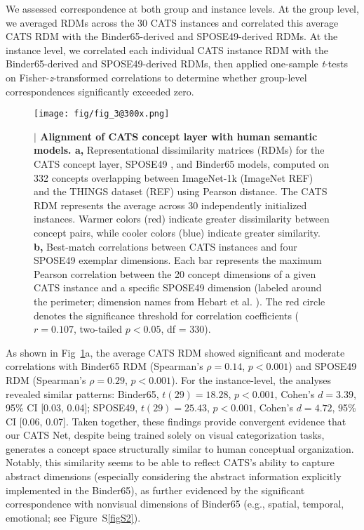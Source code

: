 \documentclass[pdflatex,sn-mathphys-num,lineno]{sn-jnl}%
\begin{document}
\begin{CJK}{UTF8}{gbsn}
We assessed correspondence at both group and instance levels. At the group level, we averaged RDMs across the 30 CATS instances and correlated this average CATS RDM with the Binder65-derived and SPOSE49-derived RDMs. At the instance level, we correlated each individual CATS instance RDM with the Binder65-derived and SPOSE49-derived RDMs, then applied one-sample \textit{t}-tests on Fisher-\textit{z}-transformed correlations to determine whether group-level correspondences significantly exceeded zero.

\begin{figure}[htbp]
\centering
\texttt{[image: fig/fig\_3@300x.png]}
\caption{\textbf{$\vert$ Alignment of CATS concept layer with human semantic models. a,} Representational dissimilarity matrices (RDMs) for the CATS concept layer, SPOSE49 \cite{hebart_revealing_2020}, and Binder65 \cite{binder_toward_2016} models, computed on 332 concepts overlapping between ImageNet-1k (ImageNet REF) and the THINGS dataset (REF) using Pearson distance. The CATS RDM represents the average across 30 independently initialized instances. Warmer colors (red) indicate greater dissimilarity between concept pairs, while cooler colors (blue) indicate greater similarity. \textbf{b,} Best-match correlations between CATS instances and four SPOSE49 exemplar dimensions. Each bar represents the maximum Pearson correlation between the 20 concept dimensions of a given CATS instance and a specific SPOSE49 dimension (labeled around the perimeter; dimension names from Hebart et al. \cite{hebart_revealing_2020}). The red circle denotes the significance threshold for correlation coefficients ($r = 0.107$, two-tailed $p < 0.05$, df = 330).}
\label{fig3}
\end{figure}

As shown in Fig~\ref{fig3}a, the average CATS RDM showed significant and moderate correlations with Binder65 RDM (Spearman’s $\rho = 0.14$, $p < 0.001$) and SPOSE49 RDM (Spearman’s $\rho = 0.29$, $p < 0.001$). For the instance-level, the analyses revealed similar patterns: Binder65, $t(29) = 18.28$, $p < 0.001$, Cohen’s $d = 3.39$, 95\% CI [0.03, 0.04]; SPOSE49, $t(29) = 25.43$, $p < 0.001$, Cohen’s $d = 4.72$, 95\% CI [0.06, 0.07]. Taken together, these findings provide convergent evidence that our CATS Net, despite being trained solely on visual categorization tasks, generates a concept space structurally similar to human conceptual organization. Notably, this similarity seems to be able to reflect CATS’s ability to capture abstract dimensions (especially considering the abstract information explicitly implemented in the Binder65), as further evidenced by the significant correspondence with nonvisual dimensions of Binder65 (e.g., spatial, temporal, emotional; see Figure~S\ref{figS2}). 


\end{CJK}
\end{document}
